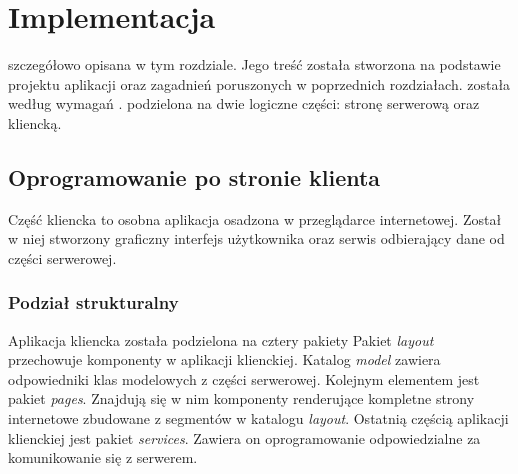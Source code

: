 \documentclass[12pt, twoside]{report}
\begin{document}

\chapter{Implementacja}
  szczegółowo opisana w tym rozdziale. Jego treść została stworzona na podstawie projektu aplikacji oraz zagadnień poruszonych w poprzednich rozdziałach.  została  według  wymagań .  podzielona na dwie logiczne części: stronę serwerową oraz kliencką.  

\section{Oprogramowanie po stronie klienta}
Część kliencka to osobna aplikacja osadzona w przeglądarce internetowej. Został w niej stworzony graficzny interfejs użytkownika oraz serwis odbierający dane od części serwerowej.

\subsection{Podział strukturalny}
Aplikacja kliencka została  podzielona na cztery pakiety 
Pakiet \textit{layout} przechowuje komponenty w aplikacji klienckiej. Katalog \textit{model} zawiera odpowiedniki klas modelowych z części serwerowej. Kolejnym elementem jest pakiet \textit{pages}. Znajdują się w nim komponenty renderujące kompletne strony internetowe zbudowane z segmentów  w katalogu \textit{layout}. Ostatnią częścią aplikacji klienckiej jest pakiet \textit{services}. Zawiera on oprogramowanie odpowiedzialne za komunikowanie się z serwerem. 
\end{document}
